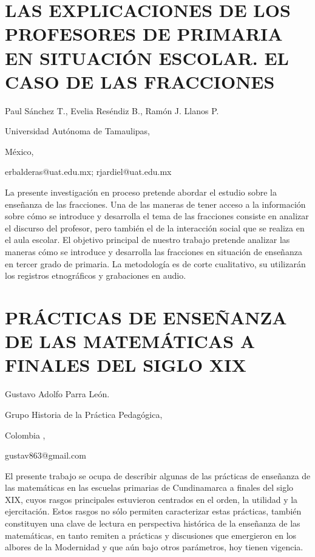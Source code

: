 \section{LAS EXPLICACIONES DE LOS PROFESORES DE PRIMARIA EN SITUACIÓN ESCOLAR.
EL CASO DE LAS FRACCIONES}

\begin{datos}

Paul Sánchez T., Evelia Reséndiz B., Ramón J. Llanos P.

Universidad Autónoma de Tamaulipas, 

México,

erbalderas@uat.edu.mx; rjardiel@uat.edu.mx 

\end{datos}

La presente investigación en proceso pretende abordar el estudio sobre
la enseñanza de las fracciones. Una de las maneras de tener acceso
a la información sobre cómo se introduce y desarrolla el tema de las
fracciones consiste en analizar el discurso del profesor, pero también
el de la interacción social que se realiza en el aula escolar. El
objetivo principal de nuestro trabajo pretende analizar las maneras
cómo se introduce y desarrolla las fracciones en situación de enseñanza
en tercer grado de primaria. La metodología es de corte cualitativo,
su utilizarán los registros etnográficos y grabaciones en audio.


\section{PRÁCTICAS DE ENSEÑANZA DE LAS MATEMÁTICAS A FINALES DEL SIGLO XIX}

\begin{datos}

Gustavo Adolfo Parra León.

Grupo Historia de la Práctica Pedagógica,

Colombia ,

gustav863@gmail.com

\end{datos}

El presente trabajo se ocupa de describir algunas de las prácticas
de enseñanza de las matemáticas en las escuelas primarias de Cundinamarca
a finales del siglo XIX, cuyos rasgos principales estuvieron centrados
en el orden, la utilidad y la ejercitación. Estos rasgos no sólo permiten
caracterizar estas prácticas, también constituyen una clave de lectura
en perspectiva histórica de la enseñanza de las matemáticas, en tanto
remiten a prácticas y discusiones que emergieron en los albores de
la Modernidad y que aún bajo otros parámetros, hoy tienen vigencia.


